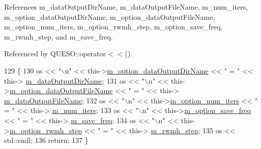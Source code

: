 References m\-\_\-data\-Output\-Dir\-Name, m\-\_\-data\-Output\-File\-Name, m\-\_\-num\-\_\-iters, m\-\_\-option\-\_\-data\-Output\-Dir\-Name, m\-\_\-option\-\_\-data\-Output\-File\-Name, m\-\_\-option\-\_\-num\-\_\-iters, m\-\_\-option\-\_\-rwmh\-\_\-step, m\-\_\-option\-\_\-save\-\_\-freq, m\-\_\-rwmh\-\_\-step, and m\-\_\-save\-\_\-freq.



Referenced by Q\-U\-E\-S\-O\-::operator$<$$<$().


\begin{DoxyCode}
129 \{
130   os << \textcolor{stringliteral}{"\(\backslash\)n"} << this->\hyperlink{class_q_u_e_s_o_1_1_infinite_dimensional_m_c_m_c_sampler_options_a75dac93b87f4e93ffef95b35c7382ad2}{m\_option\_dataOutputDirName} << \textcolor{stringliteral}{" = "} << this->
      \hyperlink{class_q_u_e_s_o_1_1_infinite_dimensional_m_c_m_c_sampler_options_a224d09b8aa3f31aa2134338ae2a60018}{m\_dataOutputDirName};
131   os << \textcolor{stringliteral}{"\(\backslash\)n"} << this->\hyperlink{class_q_u_e_s_o_1_1_infinite_dimensional_m_c_m_c_sampler_options_a4c405def589baa661b5e76f0ca0ef280}{m\_option\_dataOutputFileName} << \textcolor{stringliteral}{" = "} << this->
      \hyperlink{class_q_u_e_s_o_1_1_infinite_dimensional_m_c_m_c_sampler_options_a2146a3f4d0f276081484743bf3c5b5aa}{m\_dataOutputFileName};
132   os << \textcolor{stringliteral}{"\(\backslash\)n"} << this->\hyperlink{class_q_u_e_s_o_1_1_infinite_dimensional_m_c_m_c_sampler_options_ab27e1a612339e516eb32b326e1dd6ed5}{m\_option\_num\_iters} << \textcolor{stringliteral}{" = "} << this->
      \hyperlink{class_q_u_e_s_o_1_1_infinite_dimensional_m_c_m_c_sampler_options_a65fbd7c98f6e3820206382da50a0133e}{m\_num\_iters};
133   os << \textcolor{stringliteral}{"\(\backslash\)n"} << this->\hyperlink{class_q_u_e_s_o_1_1_infinite_dimensional_m_c_m_c_sampler_options_ac2ebcd1aff902c0b01fec2366fe775b6}{m\_option\_save\_freq} << \textcolor{stringliteral}{" = "} << this->
      \hyperlink{class_q_u_e_s_o_1_1_infinite_dimensional_m_c_m_c_sampler_options_aa477dfa39894194aecbc064e2d11af56}{m\_save\_freq};
134   os << \textcolor{stringliteral}{"\(\backslash\)n"} << this->\hyperlink{class_q_u_e_s_o_1_1_infinite_dimensional_m_c_m_c_sampler_options_aa76584eb25581942458195d26e032578}{m\_option\_rwmh\_step} << \textcolor{stringliteral}{" = "} << this->
      \hyperlink{class_q_u_e_s_o_1_1_infinite_dimensional_m_c_m_c_sampler_options_a08b73ed8aa86a07c5ed02394380d0434}{m\_rwmh\_step};
135   os << std::endl;
136   \textcolor{keywordflow}{return};
137 \}
\end{DoxyCode}
